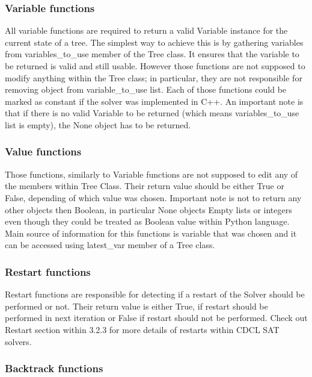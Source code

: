 \documentclass[12pt,english,pdflatex]{aghdpl}
\begin{document}
\subsubsection{Variable functions}
\label{subsubsec:Varfuncs}
All variable functions are required to return a valid Variable instance
for the  current state of a tree. The simplest way to achieve this is by
gathering variables from variables\_to\_use member of the Tree class.
It ensures that the variable to be returned is valid and still usable. However
those functions are not supposed to modify anything within the Tree class;
in particular, they are not responsible for removing object from variable\_to\_use
list. Each of those functions could be marked as constant if the solver
was implemented in C++. An important note is that if there is no valid
Variable to be returned (which means variables\_to\_use list is empty),
the None object has to be returned.

\subsubsection{Value functions}
\label{subsubsec:Valfuncs}

Those functions, similarly to Variable functions are not supposed
to edit any of the members within Tree Class. Their return value should be
either True or False, depending of which value was chosen. Important
note is not to return any other objects then Boolean, in particular
None objects Empty lists or integers even though they could be treated
as Boolean value within Python language. Main source of information for this
functions is variable that was chosen and it can be accessed using
latest\_var member of a Tree class.

\subsubsection{Restart functions}
\label{subsubsec:restartfuncs}

Restart functions are responsible for detecting if a  restart of the  Solver
should be performed or not. Their return value is either True, if
restart should be performed in next iteration or False if restart
should not be performed. Check out Restart section within 3.2.3 for
more details of restarts within CDCL SAT solvers.

\subsubsection{Backtrack functions}
\label{subsubsec:Backfuncs}
\end{document}

